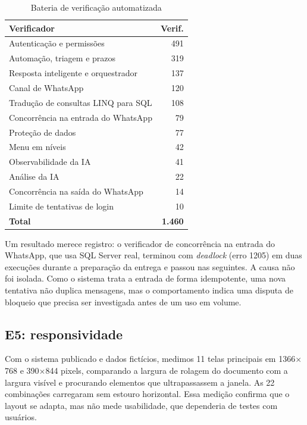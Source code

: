 \documentclass[conference]{IEEEtran}
\begin{document}
\begin{table}[t]
\caption{Bateria de verificação automatizada}
\label{tab:verificadores}
\centering
\footnotesize
\begin{tabular}{@{}L{5.8cm}r@{}}
\toprule
\textbf{Verificador} & \textbf{Verif.} \\
\midrule
Autenticação e permissões & 491 \\
Automação, triagem e prazos & 319 \\
Resposta inteligente e orquestrador & 137 \\
Canal de WhatsApp & 120 \\
Tradução de consultas LINQ para SQL & 108 \\
Concorrência na entrada do WhatsApp & 79 \\
Proteção de dados & 77 \\
Menu em níveis & 42 \\
Observabilidade da IA & 41 \\
Análise da IA & 22 \\
Concorrência na saída do WhatsApp & 14 \\
Limite de tentativas de login & 10 \\
\midrule
\textbf{Total} & \textbf{1.460} \\
\bottomrule
\end{tabular}
\end{table}

Um resultado merece registro: o verificador de concorrência na entrada do WhatsApp, que usa SQL Server real, terminou com \emph{deadlock} (erro 1205) em duas execuções durante a preparação da entrega e passou nas seguintes. A causa não foi isolada. Como o sistema trata a entrada de forma idempotente, uma nova tentativa não duplica mensagens, mas o comportamento indica uma disputa de bloqueio que precisa ser investigada antes de um uso em volume.

\subsection{E5: responsividade}

Com o sistema publicado e dados fictícios, medimos 11 telas principais em 1366$\times$768 e 390$\times$844 pixels, comparando a largura de rolagem do documento com a largura visível e procurando elementos que ultrapassassem a janela. As 22 combinações carregaram sem estouro horizontal. Essa medição confirma que o layout se adapta, mas não mede usabilidade, que dependeria de testes com usuários.
\end{document}
